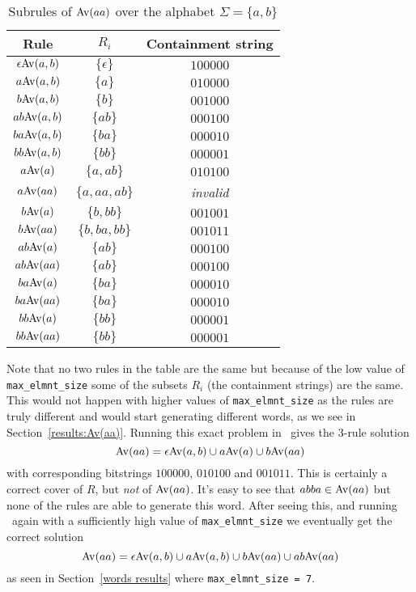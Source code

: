 {\renewcommand{\arraystretch}{1.5}
\begin{table}[ht]
    \centering
    \begin{tabular}{ c | c | c }
        Rule & $R_i$ & Containment string \\
        \hline\hline
        $\epsilon {\mathrm{Av}\!\left(a,b\right)}$ & $\{ \epsilon \}$ & $100000$ \\
        $a {\mathrm{Av}\!\left(a,b\right)}$ & $\{ a \}$ & $010000$ \\
        $b {\mathrm{Av}\!\left(a,b\right)}$ & $\{ b \}$ & $001000$ \\
        $ab {\mathrm{Av}\!\left(a,b\right)}$ & $\{ ab \}$ & $000100$ \\
        $ba {\mathrm{Av}\!\left(a,b\right)}$ & $\{ ba \}$ & $000010$ \\
        $bb {\mathrm{Av}\!\left(a,b\right)}$ & $\{ bb \}$ & $000001$ \\
        $a {\mathrm{Av}\!\left(a\right)}$ & $\{ a, ab \}$ & $010100$ \\
        $a {\mathrm{Av}\!\left(aa\right)}$ & $\{ a, aa, ab \}$ & \emph{invalid} \\
        $b {\mathrm{Av}\!\left(a\right)}$ & $\{ b, bb \}$ & $001001$ \\
        $b {\mathrm{Av}\!\left(aa\right)}$ & $\{ b, ba, bb \}$ & $001011$ \\
        $ab {\mathrm{Av}\!\left(a\right)}$ & $\{ ab \}$ & $000100$ \\
        $ab {\mathrm{Av}\!\left(aa\right)}$ & $\{ ab \}$ & $000100$ \\
        $ba {\mathrm{Av}\!\left(a\right)}$ & $\{ ba \}$ & $000010$ \\
        $ba {\mathrm{Av}\!\left(aa\right)}$ & $\{ ba \}$ & $000010$ \\
        $bb {\mathrm{Av}\!\left(a\right)}$ & $\{ bb \}$ & $000001$ \\
        $bb {\mathrm{Av}\!\left(aa\right)}$ & $\{ bb \}$ & $000001$ \\
    \hline \hline
    \end{tabular}
    \caption{Subrules of ${\mathrm{Av}\!\left(aa\right)}$ over the alphabet $\Sigma = \{a, b\}$}
    \label{table:subrules of Av(aa)}
\end{table}}

Note that no two rules in the table are the same but because of the low value 
of \texttt{max\_elmnt\_size} some of the subsets $R_i$ (the containment strings) 
are the same. This would not happen with higher values of 
\texttt{max\_elmnt\_size} as the rules are truly different and would start 
generating different words, as we see in Section~\ref{results:Av(aa)}. Running 
this exact problem in \CombCov\ gives the 3-rule solution \[ {\mathrm{Av}\!\left(aa\right)} = 
\epsilon {\mathrm{Av}\!\left(a,b\right)} \cup a {\mathrm{Av}\!\left(a\right)} \cup b {\mathrm{Av}\!\left(aa\right)} \] with corresponding bitstrings 
$100000$, $010100$ and $001011$. This is certainly a correct cover of $R$, but 
\emph{not} of ${\mathrm{Av}\!\left(aa\right)}$. It's easy to see that $abba \in {\mathrm{Av}\!\left(aa\right)}$ but none of 
the rules are able to generate this word. After seeing this, and running 
\CombCov\ again with a sufficiently high value of \texttt{max\_elmnt\_size} we 
eventually get the correct solution \[{\mathrm{Av}\!\left(aa\right)} = \epsilon {\mathrm{Av}\!\left(a,b\right)} \cup a 
{\mathrm{Av}\!\left(a,b\right)} \cup b {\mathrm{Av}\!\left(aa\right)} \cup ab {\mathrm{Av}\!\left(aa\right)}\] as seen in Section~\ref{words results} 
where \texttt{max\_elmnt\_size = 7}.


